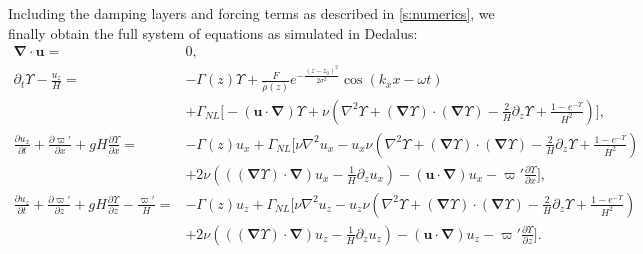 \documentclass[
        fleqn,
        usenatbib,
        referee,
    ]{mnras}
\newcommand*{\pd}[2]{\frac{\partial#1}{\partial#2}}
\newcommand*{\p}[1]{\left(#1\right)}
\newcommand*{\bm}[1]{\mathbf{#1}}
\begin{document}
Including the damping layers and forcing terms as described in
\autoref{s:numerics}, we finally obtain the full system of equations as
simulated in Dedalus:
\begin{subequations}\label{se:dedalus_eqs}
    \begin{align}
        \bm{\nabla} \cdot \bm{u} ={}& 0,\\
        \partial_t \Upsilon - \frac{u_z}{H}
            ={}& -\Gamma(z) \Upsilon
                + \frac{F}{\overline{\rho}(z)}e^{-\frac{(z - z_0)^2}{2\sigma^2}}
                    \cos \p{k_xx - \omega t}\nonumber\\
            & + \Gamma_{NL} \bigg[-\p{\bm{u} \cdot \bm{\nabla}}\Upsilon
                + \nu\p{\nabla^2 \Upsilon + \p{
                    \bm{\nabla} \Upsilon} \cdot \p{\bm{\nabla}\Upsilon}
                    - \frac{2}{H}\partial_z \Upsilon
                    + \frac{1 - e^{-\Upsilon}}{H^2}}\bigg],\\
        \pd{u_x}{t} + \pd{\varpi'}{x} + gH\pd{\Upsilon}{x} ={}&
            -\Gamma(z) u_x
            + \Gamma_{NL}\bigg[\nu \nabla^2 u_x
            - u_x \nu\p{\nabla^2 \Upsilon + \p{\bm{\nabla} \Upsilon} \cdot
                \p{\bm{\nabla}\Upsilon} - \frac{2}{H}\partial_z \Upsilon
                + \frac{1 - e^{-\Upsilon}}{H^2}}\nonumber\\
            &+ 2\nu \p{\p{\p{\bm{\nabla}\Upsilon} \cdot \bm{\nabla}}u_x
                - \frac{1}{H}\partial_z u_x}
                - \p{\bm{u} \cdot \bm{\nabla}}u_x
                - \varpi' \pd{\Upsilon}{x}\bigg],\\
        \pd{u_z}{t} + \pd{\varpi'}{z} + gH\pd{\Upsilon}{z} - \frac{\varpi'}{H}
            ={}& -\Gamma(z) u_z
            +\Gamma_{NL}\bigg[\nu \nabla^2 u_z
            - u_z \nu\p{\nabla^2 \Upsilon + \p{\bm{\nabla} \Upsilon} \cdot
                \p{\bm{\nabla}\Upsilon} - \frac{2}{H}\partial_z \Upsilon
                + \frac{1 - e^{-\Upsilon}}{H^2}}\nonumber\\
            &+ 2\nu \p{\p{\p{\bm{\nabla}\Upsilon} \cdot \bm{\nabla}}u_z -
                \frac{1}{H}\partial_z u_{z}}
            - \p{\bm{u} \cdot \bm{\nabla}}u_z
            - \varpi' \pd{\Upsilon}{z}\bigg].
    \end{align}
\end{subequations}
\label{lastpage} %
\end{document}
